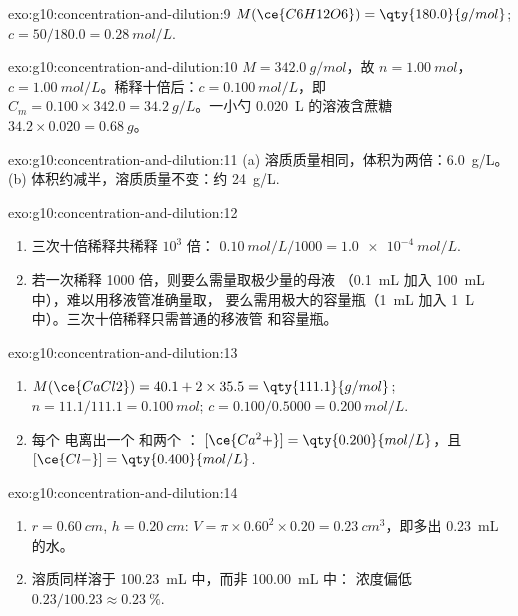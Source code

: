 \begin{solution}{exo:g10:concentration-and-dilution:9}
$M(\ce{C6H12O6}) = \qty{180.0}{g/mol}$; $c = 50 / 180.0 =
\qty{0.28}{mol/L}$.
\end{solution}

\begin{solution}{exo:g10:concentration-and-dilution:10}
$M = \qty{342.0}{g/mol}$，故 $n = \qty{1.00}{mol}$，$c =
\qty{1.00}{mol/L}$。稀释十倍后：$c = \qty{0.100}{mol/L}$，即
$C_m = 0.100 \times 342.0 = \qty{34.2}{g/L}$。一小勺
\qty{0.020}{L} 的溶液含蔗糖 $34.2 \times 0.020 = \qty{0.68}{g}$。
\end{solution}

\begin{solution}{exo:g10:concentration-and-dilution:11}
(a) 溶质质量相同，体积为两倍：\qty{6.0}{g/L}。
(b) 体积约减半，溶质质量不变：约
\qty{24}{g/L}.
\end{solution}

\begin{solution}{exo:g10:concentration-and-dilution:12}
\begin{enumerate}
  \item 三次十倍稀释共稀释 $10^3$ 倍：
        $\qty{0.10}{mol/L} / 1000 = \qty{1.0e-4}{mol/L}$.
  \item 若一次稀释 1000 倍，则要么需量取极少量的母液
        （\qty{0.1}{mL} 加入 \qty{100}{mL} 中），难以用移液管准确量取，
        要么需用极大的容量瓶（\qty{1}{mL} 加入
        \qty{1}{L} 中）。三次十倍稀释只需普通的移液管
        和容量瓶。
\end{enumerate}
\end{solution}

\begin{solution}{exo:g10:concentration-and-dilution:13}
\begin{enumerate}
  \item $M(\ce{CaCl2}) = 40.1 + 2 \times 35.5 = \qty{111.1}{g/mol}$;
        $n = 11.1 / 111.1 = \qty{0.100}{mol}$; $c = 0.100 / 0.5000 =
        \qty{0.200}{mol/L}$.
  \item 每个  电离出一个  和两个 ：
        $[\ce{Ca^2+}] = \qty{0.200}{mol/L}$，且 $[\ce{Cl-}] =
        \qty{0.400}{mol/L}$.
\end{enumerate}
\end{solution}

\begin{solution}{exo:g10:concentration-and-dilution:14}
\begin{enumerate}
  \item $r = \qty{0.60}{cm}$, $h = \qty{0.20}{cm}$:
        $V = \pi \times 0.60^2 \times 0.20 = \qty{0.23}{cm^3}$，即多出
        \qty{0.23}{mL} 的水。
  \item 溶质同样溶于 \qty{100.23}{mL} 中，而非 \qty{100.00}{mL} 中：
        浓度偏低 $0.23 / 100.23 \approx
        \qty{0.23}{\percent}$.
\end{enumerate}
\end{solution}

